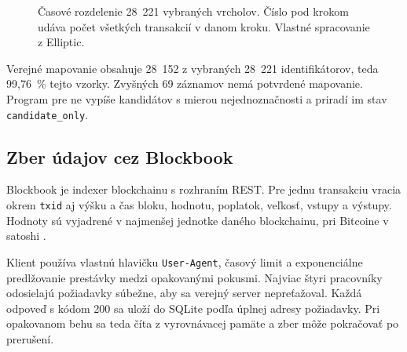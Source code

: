 \begin{figure}[htbp]
  \centering
  \caption{Časové rozdelenie 28~221 vybraných vrcholov. Číslo pod
  krokom udáva počet všetkých transakcií v danom kroku. Vlastné
  spracovanie z Elliptic.}
  \label{fig:selected-split-timeline}
\end{figure}

Verejné mapovanie obsahuje 28~152 z vybraných 28~221 identifikátorov,
teda 99,76~\% tejto vzorky. Zvyšných 69 záznamov nemá potvrdené
mapovanie. Program pre ne vypíše kandidátov s mierou nejednoznačnosti a
priradí im stav \texttt{candidate\_only}.

\subsection{Zber údajov cez Blockbook}

Blockbook je indexer blockchainu s rozhraním REST. Pre jednu transakciu
vracia okrem \texttt{txid} aj výšku a čas bloku, hodnotu, poplatok,
veľkosť, vstupy a výstupy. Hodnoty sú vyjadrené v najmenšej jednotke
daného blockchainu, pri Bitcoine v satoshi \cite{blockbook}.

Klient používa vlastnú hlavičku \texttt{User-Agent}, časový limit a
exponenciálne predlžovanie prestávky medzi opakovanými pokusmi. Najviac
štyri pracovníky odosielajú požiadavky súbežne, aby sa verejný server
nepreťažoval. Každá odpoveď s kódom 200 sa uloží do SQLite podľa úplnej
adresy požiadavky. Pri opakovanom behu sa teda číta z vyrovnávacej
pamäte a zber môže
pokračovať po prerušení.

